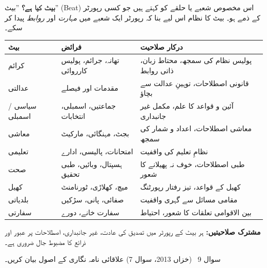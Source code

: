 \begin{hal}
\textbf{بیٹ کیا ہے؟} ''بیٹ'' (\textenglish{Beat}) اس مخصوص شعبے یا حلقے کو
کہتے ہیں جو کسی رپورٹر کے ذمے ہو۔ بیٹ کا نظام اس لیے بنا کہ رپورٹر ایک شعبے
میں \emph{مہارت} اور \emph{روابط} پیدا کر سکے۔

\medskip
\begin{center}
\begin{tabular}{@{}p{3.0cm} p{5.4cm} p{6.0cm}@{}}
\toprule
\textbf{بیٹ} & \textbf{فرائض} & \textbf{درکار صلاحیت} \\
\midrule
کرائم & تھانہ، جرائم، پولیس کارروائی & پولیس نظام کی سمجھ، محتاط زبان، ذاتی روابط \\
عدالتی & مقدمات اور فیصلے & قانونی اصطلاحات، توہینِ عدالت سے بچاؤ \\
سیاسی / اسمبلی & جماعتیں، اسمبلی، انتخابات & آئین و قواعد کا علم، مکمل غیر جانبداری \\
معاشی & بجٹ، مہنگائی، مارکیٹ & معاشی اصطلاحات، اعداد و شمار کی سمجھ \\
تعلیمی & امتحانات، پالیسی، ادارے & نظامِ تعلیم کی واقفیت \\
صحت & ہسپتال، وبائیں، طبی تحقیق & طبی اصطلاحات، خوف نہ پھیلانے کا شعور \\
کھیل & میچ، کھلاڑی، ٹورنامنٹ & کھیل کے قواعد، تیز رفتار رپورٹنگ \\
بلدیاتی & صفائی، پانی، سڑکیں & مقامی مسائل سے گہری واقفیت \\
سفارتی & سفارت خانے، دورے & بین الاقوامی تعلقات کا شعور، احتیاط \\
\bottomrule
\end{tabular}
\end{center}

\medskip
\textbf{مشترک صلاحیتیں:} ہر بیٹ کے رپورٹر میں تصدیق کی عادت، غیر جانبداری،
اصطلاحات پر عبور اور ذرائع کا مضبوط جال ضروری ہے۔

\end{hal}

\begin{sawal}{سوال \textenglish{9} \ \textnormal{\small(خزاں \textenglish{2013}، سوال \textenglish{7})}}
علاقائی نامہ نگاری کے اصول بیان کریں۔
\end{sawal}

